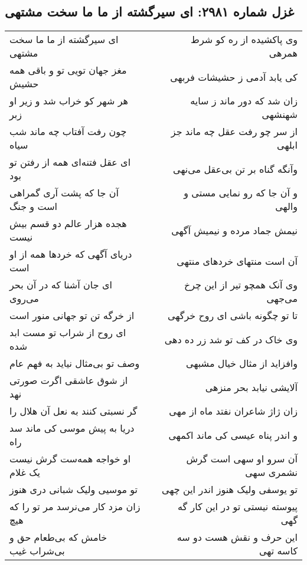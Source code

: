 \begin{center}
\section*{غزل شماره ۲۹۸۱: ای سیرگشته از ما ما سخت مشتهی}
\label{sec:2981}
\begin{longtable}{l p{0.5cm} r}
ای سیرگشته از ما ما سخت مشتهی
&&
وی پاکشیده از ره کو شرط همرهی
\\
مغز جهان تویی تو و باقی همه حشیش
&&
کی یابد آدمی ز حشیشات فربهی
\\
هر شهر کو خراب شد و زیر او زبر
&&
زان شد که دور ماند ز سایه شهنشهی
\\
چون رفت آفتاب چه ماند شب سیاه
&&
از سر چو رفت عقل چه ماند جز ابلهی
\\
ای عقل فتنه‌ای همه از رفتن تو بود
&&
وآنگه گناه بر تن بی‌عقل می‌نهی
\\
آن جا که پشت آری گمراهی است و جنگ
&&
و آن جا که رو نمایی مستی و والهی
\\
هجده هزار عالم دو قسم بیش نیست
&&
نیمش جماد مرده و نیمیش آگهی
\\
دریای آگهی که خردها همه از او است
&&
آن است منتهای خردهای منتهی
\\
ای جان آشنا که در آن بحر می‌روی
&&
وی آنک همچو تیر از این چرخ می‌جهی
\\
از خرگه تن تو جهانی منور است
&&
تا تو چگونه باشی ای روح خرگهی
\\
ای روح از شراب تو مست ابد شده
&&
وی خاک در کف تو شد زر ده دهی
\\
وصف تو بی‌مثال نیاید به فهم عام
&&
وافزاید از مثال خیال مشبهی
\\
از شوق عاشقی اگرت صورتی نهد
&&
آلایشی نیابد بحر منزهی
\\
گر نسبتی کنند به نعل آن هلال را
&&
زان ژاژ شاعران نفتد ماه از مهی
\\
دریا به پیش موسی کی ماند سد راه
&&
و اندر پناه عیسی کی ماند اکمهی
\\
او خواجه همه‌ست گرش نیست یک غلام
&&
آن سرو او سهی است گرش نشمری سهی
\\
تو موسیی ولیک شبانی دری هنوز
&&
تو یوسفی ولیک هنوز اندر این چهی
\\
زان مزد کار می‌نرسد مر تو را که هیچ
&&
پیوسته نیستی تو در این کار گه گهی
\\
خامش که بی‌طعام حق و بی‌شراب غیب
&&
این حرف و نقش هست دو سه کاسه تهی
\\
\end{longtable}
\end{center}
